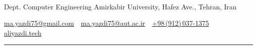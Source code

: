 \documentclass[letterpaper,MMMyyyy,nonstopmode]{resume}
\newcommand{\CVAuthor}{Ali Yazdi}
\newcommand{\CVWebpageName}{aliyazdi.tech}
\newcommand{\CVWebpage}{https://aliyazdi.tech}
\begin{document}

\Title{\CVAuthor}

\begin{SubTitle}
\normalsize{
\href{https://t.me/aliyazdi75}
{\faTelegram}
\,\textbullet\,
\href{https://www.instagram.com/aliyazdi75}
{\faInstagram}
\,\textbullet\,
\href{https://join.skype.com/invite/h3jUqpJH9jLh}
{\faSkype}
\,\textbullet\,
\href{https://twitter.com/aliyazdi75}
{\faTwitter}
\,\textbullet\,
\href{https://www.linkedin.com/in/aliyazdi75}
{\faLinkedin}
\,\textbullet\,
\href{https://github.com/aliyazdi75}
{\faGithub}
\,\textbullet\,
\href{https://medium.com/@aliyazdi75}
{\faMedium}
\,\textbullet\,
\href{mailto:ma.yazdi75@gmail.com}
{\faEnvelope}
\,\textbullet\,
\href{tel:+989120371375}
{\faPhone}
\,\textbullet\,
\href{\CVWebpage}
{\faGlobe}
}
\par
Dept. Computer Engineering Amirkabir University, Hafez Ave., Tehran, Iran
\par
\href{mailto:ma.yazdi75@gmail.com}
{ma.yazdi75@gmail.com}
\,\SubBulletSymbol\,
\href{mailto:ma.yazdi75@aut.ac.ir}
{ma.yazdi75@aut.ac.ir}
\,\SubBulletSymbol\,
\href{tel:+989120371375}
{+98\,(912)\,037-1375}
\,\SubBulletSymbol\,
\href{\CVWebpage}
{\CVWebpageName}
\end{SubTitle}

\smallskip\hrule
\end{document}

